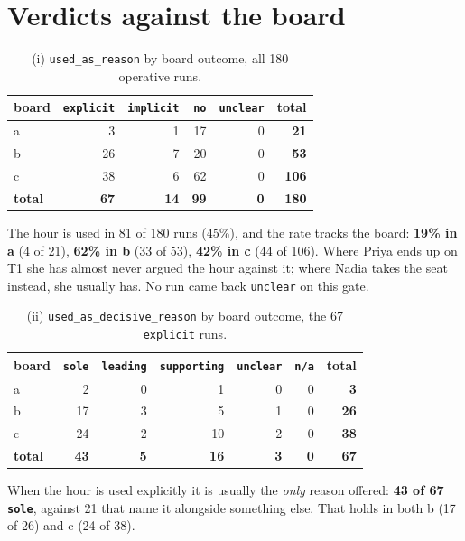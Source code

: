 \documentclass[11pt,a4paper]{article}
\begin{document}
\section{Verdicts against the board}

\begin{table}[htbp]
\centering
\small
\caption{(i) \texttt{used\_as\_reason} by board outcome, all 180 operative runs.}
\label{tab:i}
\begin{tabular}{lrrrrr}
\toprule
board & \texttt{explicit} & \texttt{implicit} & \texttt{no} & \texttt{unclear} & total \\
\midrule
a & 3 & 1 & 17 & 0 & \textbf{21} \\
b & 26 & 7 & 20 & 0 & \textbf{53} \\
c & 38 & 6 & 62 & 0 & \textbf{106} \\
\midrule
\textbf{total} & \textbf{67} & \textbf{14} & \textbf{99} & \textbf{0} & \textbf{180} \\
\bottomrule
\end{tabular}
\end{table}

The hour is used in 81 of 180 runs (45\%), and the rate tracks the board: \textbf{19\% in a}
(4 of 21), \textbf{62\% in b} (33 of 53), \textbf{42\% in c} (44 of 106). Where Priya ends up on T1
she has almost never argued the hour against it; where Nadia takes the seat instead, she usually
has. No run came back \texttt{unclear} on this gate.

\begin{table}[htbp]
\centering
\small
\caption{(ii) \texttt{used\_as\_decisive\_reason} by board outcome, the 67 \texttt{explicit} runs.}
\label{tab:ii}
\begin{tabular}{lrrrrrr}
\toprule
board & \texttt{sole} & \texttt{leading} & \texttt{supporting} & \texttt{unclear} & \texttt{n/a} & total \\
\midrule
a & 2 & 0 & 1 & 0 & 0 & \textbf{3} \\
b & 17 & 3 & 5 & 1 & 0 & \textbf{26} \\
c & 24 & 2 & 10 & 2 & 0 & \textbf{38} \\
\midrule
\textbf{total} & \textbf{43} & \textbf{5} & \textbf{16} & \textbf{3} & \textbf{0} & \textbf{67} \\
\bottomrule
\end{tabular}
\end{table}

When the hour is used explicitly it is usually the \emph{only} reason offered: \textbf{43 of 67
\texttt{sole}}, against 21 that name it alongside something else. That holds in both b (17 of 26)
and c (24 of 38).
\end{document}
